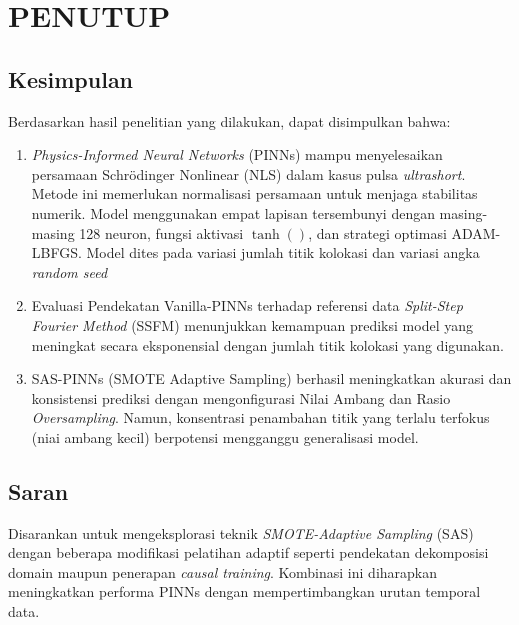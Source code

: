 \chapter{PENUTUP}

\section{Kesimpulan}

Berdasarkan hasil penelitian yang dilakukan, dapat disimpulkan bahwa: 

\begin{enumerate}

    \item \emph{Physics-Informed Neural Networks} (PINNs) mampu menyelesaikan persamaan Schr\"{o}dinger Nonlinear (NLS) dalam kasus pulsa \emph{ultrashort}. Metode ini memerlukan normalisasi persamaan untuk menjaga stabilitas numerik. Model menggunakan empat lapisan tersembunyi dengan masing-masing 128 neuron, fungsi aktivasi $\tanh()$, dan strategi optimasi ADAM-LBFGS. Model dites pada variasi jumlah titik kolokasi dan variasi angka \emph{random seed}

    \item Evaluasi Pendekatan Vanilla-PINNs terhadap referensi data \emph{Split-Step Fourier Method} (SSFM) menunjukkan kemampuan prediksi model yang meningkat secara eksponensial dengan jumlah titik kolokasi yang digunakan. 

    \item SAS-PINNs (SMOTE Adaptive Sampling) berhasil meningkatkan akurasi dan konsistensi prediksi dengan mengonfigurasi Nilai Ambang dan Rasio \emph{Oversampling}. Namun, konsentrasi penambahan titik yang terlalu terfokus (niai ambang kecil) berpotensi mengganggu generalisasi model.
    
\end{enumerate}

\newpage
\section{Saran}
Disarankan untuk mengeksplorasi teknik \emph{SMOTE-Adaptive Sampling} (SAS) dengan beberapa modifikasi pelatihan adaptif seperti pendekatan dekomposisi domain maupun penerapan \emph{causal training}.  Kombinasi ini diharapkan meningkatkan performa PINNs dengan mempertimbangkan urutan temporal data.